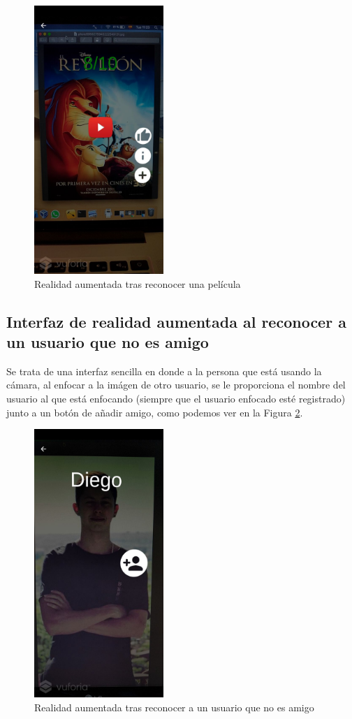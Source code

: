 \begin{figure}[H]
    \centering
    \includegraphics[height=4in]{figures/filmrecognized2.jpg}
    \caption{Realidad aumentada tras reconocer una película}
    \label{fig:ra_pelicula}
\end{figure}

\subsection{Interfaz de realidad aumentada al reconocer a un usuario que no es amigo}
\label{makereference3.4.5.1}
Se trata de una interfaz sencilla en donde a la persona que está usando la cámara, al enfocar a la imágen de otro usuario, se le proporciona el nombre del usuario al
 que está enfocando (siempre que el usuario enfocado esté registrado) junto a un botón de añadir amigo, como podemos ver en la Figura \ref{fig:ra_usuario}.
\begin{figure}[H]
    \centering
    \includegraphics[height=4in]{figures/usernotFriendrecognized.jpg}
    \caption{Realidad aumentada tras reconocer a un usuario que no es amigo}
    \label{fig:ra_usuario}
\end{figure}

